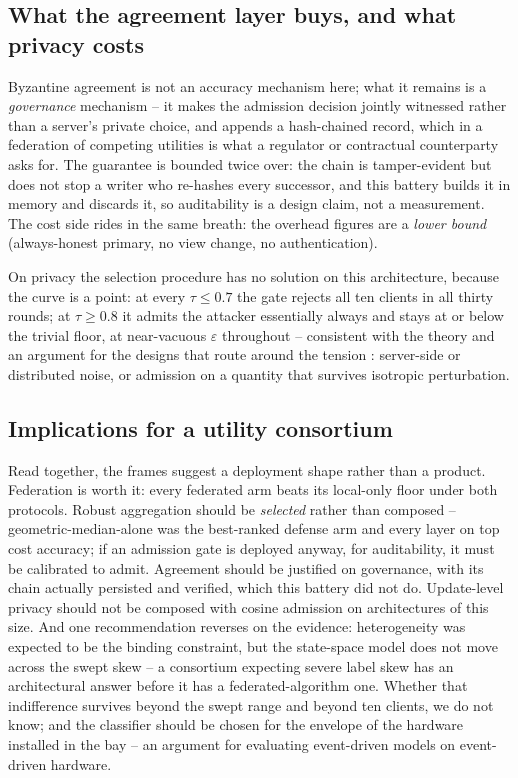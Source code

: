 \subsection{What the agreement layer buys, and what privacy costs}

Byzantine agreement is not an accuracy mechanism here; what it remains
is a \emph{governance} mechanism -- it makes the admission decision
jointly witnessed rather than a server's private choice, and appends a
hash-chained record, which in a federation of competing utilities is
what a regulator or contractual counterparty asks for. The guarantee is
bounded twice over: the chain is tamper-evident but does not stop a
writer who re-hashes every successor, and this battery builds it in
memory and discards it, so auditability is a design claim, not a
measurement. The cost side rides in the same breath: the overhead
figures are a \emph{lower bound} (always-honest primary, no view change,
no authentication).

On privacy the selection procedure has no solution on this architecture,
because the curve is a point: at every $\tau \le 0.7$ the gate rejects
all ten clients in all thirty rounds; at $\tau \ge 0.8$ it admits the
attacker essentially always and \macroF{} stays at or below the trivial
floor, at near-vacuous $\varepsilon$ throughout -- consistent with the
theory \cite{guerraoui2021podc} and an argument for the designs that
route around the tension \cite{gu2024dpbrem}: server-side or distributed
noise, or admission on a quantity that survives isotropic perturbation.

\subsection{Implications for a utility consortium}

Read together, the frames suggest a deployment shape rather than a
product. Federation is worth it: every federated arm beats its
local-only floor under both protocols. Robust aggregation should be
\emph{selected} rather than composed -- geometric-median-alone was the
best-ranked defense arm and every layer on top cost accuracy; if an
admission gate is deployed anyway, for auditability, it must be
calibrated to admit. Agreement should be justified on governance, with
its chain actually persisted and verified, which this battery did not
do. Update-level privacy should not be composed with cosine admission on
architectures of this size. And one recommendation reverses on the
evidence: heterogeneity was expected to be the binding constraint, but
the state-space model does not move across the swept skew -- a
consortium expecting severe label skew has an architectural answer
before it has a federated-algorithm one. Whether that indifference
survives beyond the swept range and beyond ten clients, we do not know;
and the classifier should be chosen for the envelope of the hardware
installed in the bay -- an argument for evaluating event-driven models
on event-driven hardware.

